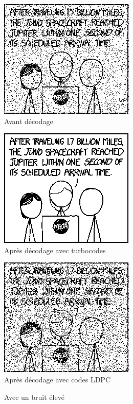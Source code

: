 \documentclass[12pt]{article}
\begin{document}
\begin{figure}[H]
	\begin{minipage}{\textwidth}
		\begin{minipage}{.3\textwidth}
			\centering
			\includegraphics[scale=0.5]{turbo_noisy_80}\\
			Avant d\'ecodage
		\end{minipage}
		\begin{minipage}{.3\textwidth}
			\centering
			\includegraphics[scale=0.5]{turbo_decoded_80}\\
			Apr\`es d\'ecodage avec turbocodes
		\end{minipage}
		\begin{minipage}{.3\textwidth}
			\centering
			\includegraphics[scale=0.5]{ldpc_basic_decoded_80}\\
			Apr\`es d\'ecodage avec codes LDPC
		\end{minipage}
	\end{minipage}
	\caption{Avec un bruit \'elev\'e}
	\label{fig:eleve}
\end{figure}
\end{document}
